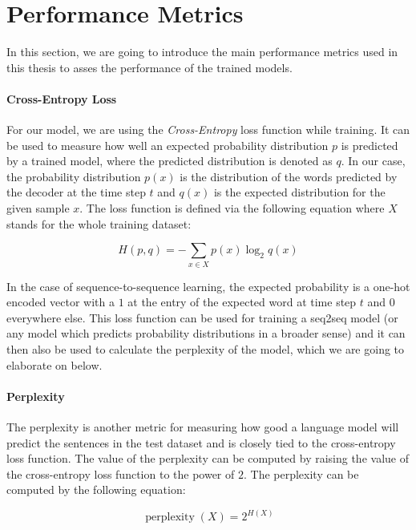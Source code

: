 \section{Performance Metrics}
\label{fundamentals:metrics}
In this section, we are going to introduce the main performance metrics used in this thesis to asses the performance of the trained models.

\paragraph{Cross-Entropy Loss} For our model, we are using the \emph{Cross-Entropy} loss function while training. It can be used to measure how well an expected probability distribution $p$ is predicted by a trained model, where the predicted distribution is denoted as $q$. In our case, the probability distribution $p(x)$ is the distribution of the words predicted by the decoder at the time step $t$ and $q(x)$ is the expected distribution for the given sample $x$. The loss function is defined via the following equation where $X$ stands for the whole training dataset:

\begin{equation}
H(p, q) = -\sum_{x \in X} p(x) \log_2 q(x)
\end{equation}

In the case of sequence-to-sequence learning, the expected probability is a one-hot encoded vector with a $1$ at the entry of the expected word at time step $t$ and $0$ everywhere else. This loss function can be used for training a seq2seq model (or any model which predicts probability distributions in a broader sense) and it can then also be used to calculate the perplexity of the model, which we are going to elaborate on below.

\paragraph{Perplexity} The perplexity is another metric for measuring how good a language model will predict the sentences in the test dataset and is closely tied to the cross-entropy loss function. The value of the perplexity can be computed by raising the value of the cross-entropy loss function to the power of $2$. The perplexity can be computed by the following equation:

\begin{equation}
\operatorname{perplexity}(X) = 2^{H(X)}
\end{equation}

